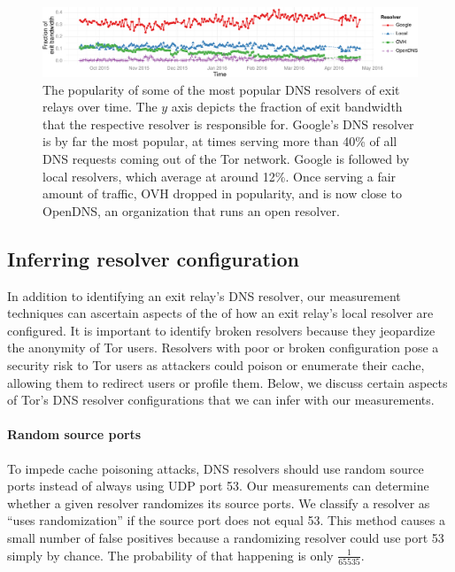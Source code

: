 \begin{figure}[t]
	\centering
	\includegraphics[width=\linewidth]{figures/asn-bw-frac.pdf}
	\caption{The popularity of some of the most popular DNS resolvers of exit
		relays over time.  The $y$ axis depicts the fraction of exit bandwidth
		that the respective resolver is responsible for.  Google's DNS resolver
		is by far the most popular, at times serving more than 40\% of all DNS
		requests coming out of the Tor network.  Google is followed by local
		resolvers, which average at around 12\%.  Once serving a fair amount of
		traffic, OVH dropped in popularity, and is now close to OpenDNS, an
		organization that runs an open resolver.}
	\label{fig:exit-resolvers}
\end{figure}


\iffalse
\subsection{Inferring resolver configuration}
\label{sec:mapping-configuration}

In addition to identifying an exit relay's DNS resolver, our measurement
techniques can ascertain aspects of the of how an exit relay's local
resolver are configured.  It is important to identify broken resolvers
because they jeopardize the anonymity of Tor users.  Resolvers with poor
or broken configuration pose a security risk to Tor users as attackers
could poison or enumerate their cache, allowing them to redirect users
or profile them. Below, we discuss certain aspects of Tor's DNS resolver
configurations that we can infer with our measurements.

\paragraph{Random source ports}
To impede cache poisoning attacks, DNS resolvers should use random
source ports instead of always using UDP port 53.  Our measurements can
determine whether a given resolver randomizes its source ports.  We
classify a resolver as ``uses randomization'' if the source port does
not equal 53.  This method causes a small number of false positives
because a randomizing resolver could use port 53 simply by chance.  The
probability of that happening is only $\frac{1}{65535}$.

